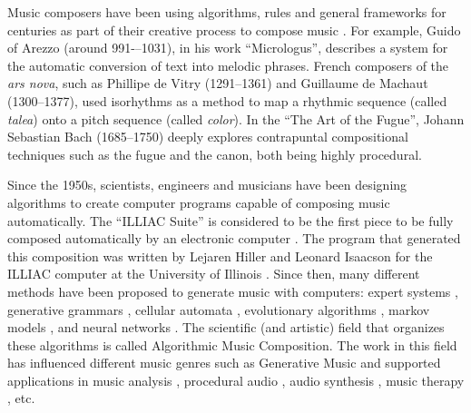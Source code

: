 
Music composers have been using algorithms, rules and general frameworks for centuries as part of
their creative process to compose music \cite{nierhaus2009algorithmic}. For example, Guido of Arezzo
(around 991-–1031), in his work ``Micrologus'', describes a system for the automatic conversion of
text into melodic phrases. French composers of the \textit{ars nova}, such as Phillipe de Vitry (1291--1361) and
Guillaume de Machaut (1300--1377), used isorhythms as a method to map a rhythmic sequence
(called \textit{talea}) onto a pitch sequence (called \textit{color}). In the ``The Art of the Fugue'',
Johann Sebastian Bach (1685--1750) deeply explores contrapuntal compositional techniques such as
the fugue and the canon, both being highly procedural.

Since the 1950s, scientists, engineers and musicians have been designing algorithms to create computer
programs capable of composing music automatically. The ``ILLIAC Suite'' is considered to be
the first piece to be fully composed automatically by an electronic computer \cite{nierhaus2009algorithmic}.
The program that generated this composition was written by Lejaren Hiller and Leonard Isaacson
for the ILLIAC computer at the University of Illinois \cite{hiller1957musical}.
Since then, many different methods have been proposed to generate music with computers:
expert systems \cite{}, generative grammars \cite{}, cellular automata \cite{},
evolutionary algorithms \cite{}, markov models \cite{}, and neural networks \cite{}.
The scientific (and artistic) field that organizes these algorithms is called Algorithmic Music Composition.
The work in this field has influenced different music genres such as Generative Music
\cite{eno1996generative} and supported applications in music analysis
\cite{lerdahl1996generative}, procedural audio \cite{farnell2007introduction},
audio synthesis \cite{engel2017neural}, music therapy \cite{williams2020use}, etc.

